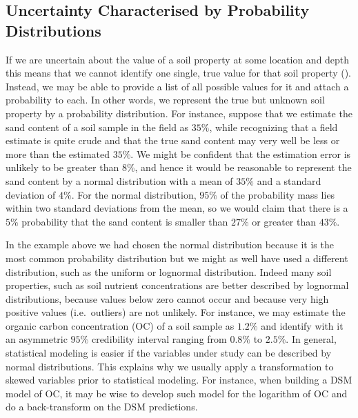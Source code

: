 \documentclass[10pt,b5paper,]{book}
\theoremstyle{definition}
\theoremstyle{definition}
\theoremstyle{definition}
\theoremstyle{remark}
\begin{document}
\hypertarget{uncertainty-characterised-by-probability-distributions}{%
\subsection{Uncertainty Characterised by Probability
Distributions}\label{uncertainty-characterised-by-probability-distributions}}

If we are uncertain about the value of a soil property at some location
and depth this means that we cannot identify one single, true value for
that soil property
(\cite{goovaerts2001geostatistical, arrouays_uncertainty_2014}).
Instead, we may be able to provide a list of all possible values for it
and attach a probability to each. In other words, we represent the true
but unknown soil property by a probability distribution. For instance,
suppose that we estimate the sand content of a soil sample in the field
as \(35\%\), while recognizing that a field estimate is quite crude and
that the true sand content may very well be less or more than the
estimated \(35\%\). We might be confident that the estimation error is
unlikely to be greater than \(8\%\), and hence it would be reasonable to
represent the sand content by a normal distribution with a mean of
\(35\%\) and a standard deviation of \(4\%\). For the normal
distribution, \(95\%\) of the probability mass lies within two standard
deviations from the mean, so we would claim that there is a \(5\%\)
probability that the sand content is smaller than \(27\%\) or greater
than \(43\%\).

In the example above we had chosen the normal distribution because it is
the most common probability distribution but we might as well have used
a different distribution, such as the uniform or lognormal distribution.
Indeed many soil properties, such as soil nutrient concentrations are
better described by lognormal distributions, because values below zero
cannot occur and because very high positive values (i.e.~outliers) are
not unlikely. For instance, we may estimate the organic carbon
concentration (OC) of a soil sample as \(1.2\%\) and identify with it an
asymmetric \(95\%\) credibility interval ranging from \(0.8\%\) to
\(2.5\%\). In general, statistical modeling is easier if the variables
under study can be described by normal distributions. This explains why
we usually apply a transformation to skewed variables prior to
statistical modeling. For instance, when building a DSM model of OC, it
may be wise to develop such model for the logarithm of OC and do a
back-transform on the DSM predictions.
\end{document}
